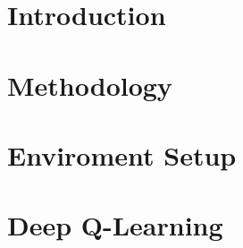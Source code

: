 \documentclass{report}
\begin{document}


\tableofcontents

\chapter{Introduction}\label{ch:intro}


\chapter{Methodology}\label{ch:methodology}


\chapter{Enviroment Setup}\label{ch:environment-setup}


\chapter{Deep Q-Learning}\label{ch:dqn}



\printnoidxglossaries{}



\end{document}
